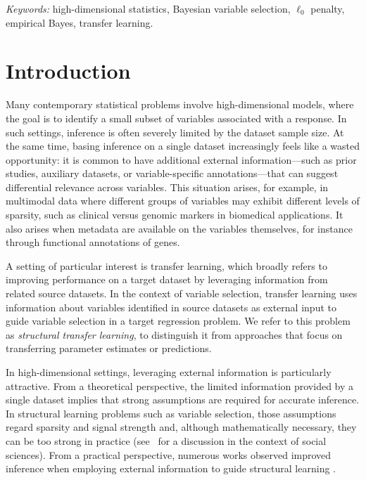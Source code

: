 \documentclass[
  12pt]{article}
\begin{document}
\noindent%
{\it Keywords:} high-dimensional statistics, Bayesian variable selection, $\ell_0$ penalty, empirical Bayes, transfer learning.
\vfill

\newpage
{} %


\maketitle

\section{Introduction}

Many contemporary statistical problems involve high-dimensional models, where the goal is to identify a small subset of variables associated with a response.
In such settings, inference is often severely limited by the dataset sample size.
At the same time, basing inference on a single dataset increasingly feels like a wasted opportunity: it is common to have additional external information—such as prior studies, auxiliary datasets, or variable-specific annotations—that can suggest differential relevance across variables. This situation arises, for example, in multimodal data \citep{liang2023multimodal} where different groups of variables may exhibit different levels of sparsity, such as clinical versus genomic markers in biomedical applications.
It also arises when metadata are available on the variables themselves, for instance through functional annotations of genes.

A setting of particular interest is transfer learning, which broadly refers to improving performance on a target dataset by leveraging information from related source datasets.
In the context of variable selection, transfer learning uses information about variables identified in source datasets as external input to guide variable selection in a target regression problem.
We refer to this problem as \emph{structural transfer learning}, to distinguish it from approaches that focus on transferring parameter estimates or predictions.

In high-dimensional settings, leveraging external information is particularly attractive.
From a theoretical perspective, the limited information provided by a single dataset implies that strong assumptions are required for accurate inference. In structural learning problems such as variable selection, those assumptions regard sparsity and signal strength and, although mathematically necessary, they can be too strong in practice 
(see~\cite{giannone2021economic} for a discussion in the context of social sciences). From a practical perspective, numerous works observed improved inference when employing external information to guide structural learning \citep{stingo:2011, Boulesteix2017, chen_tinghuei:2021}. 
\end{document}
